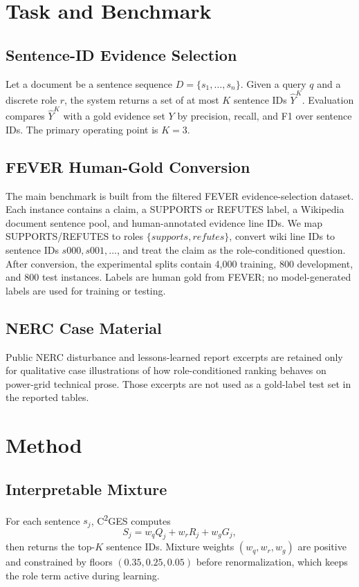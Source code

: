 \documentclass[cmc,article,submit,moreauthors,pdftex]{Definitions/tsp}
\newcommand{\cges}{C\textsuperscript{2}GES}
\begin{document}
\section{Task and Benchmark}
\label{sec:task_benchmark}

\subsection{Sentence-ID Evidence Selection}
Let a document be a sentence sequence $D=\{s_1,\ldots,s_n\}$. Given a query $q$ and a discrete role $r$, the system returns a set of at most $K$ sentence IDs $\hat{Y}^{K}$. Evaluation compares $\hat{Y}^{K}$ with a gold evidence set $Y$ by precision, recall, and F1 over sentence IDs. The primary operating point is $K=3$.

\subsection{FEVER Human-Gold Conversion}
The main benchmark is built from the filtered FEVER evidence-selection dataset. Each instance contains a claim, a SUPPORTS or REFUTES label, a Wikipedia document sentence pool, and human-annotated evidence line IDs. We map SUPPORTS/REFUTES to roles $\{supports,refutes\}$, convert wiki line IDs to sentence IDs $s000,s001,\ldots$, and treat the claim as the role-conditioned question. After conversion, the experimental splits contain 4{,}000 training, 800 development, and 800 test instances. Labels are human gold from FEVER; no model-generated labels are used for training or testing.

\subsection{NERC Case Material}
Public NERC disturbance and lessons-learned report excerpts are retained only for qualitative case illustrations of how role-conditioned ranking behaves on power-grid technical prose. Those excerpts are not used as a gold-label test set in the reported tables.

\section{Method}
\label{sec:method}

\subsection{Interpretable Mixture}
For each sentence $s_j$, \cges{} computes
\begin{equation}
S_j = w_q Q_j + w_r R_j + w_g G_j,
\end{equation}
then returns the top-$K$ sentence IDs. Mixture weights $(w_q,w_r,w_g)$ are positive and constrained by floors $(0.35,0.25,0.05)$ before renormalization, which keeps the role term active during learning.
\end{document}
